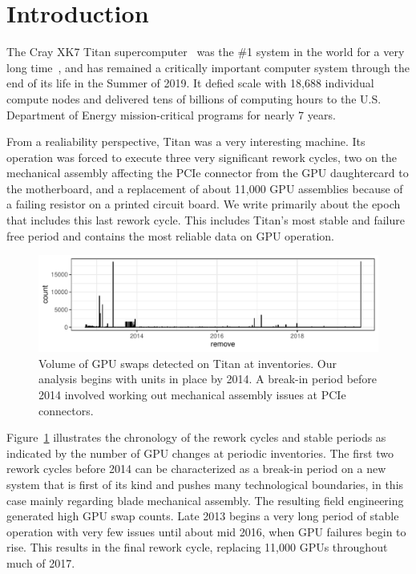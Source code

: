 \section{Introduction}
\label{section:introduction}
The Cray XK7 Titan supercomputer~\cite{olcf:titan} was the \#1 system in the world for a
very long time~\cite{top500list}, and has remained a critically important computer
system through the end of its life in the Summer of 2019. It defied
scale with 18,688 individual compute nodes and delivered tens of
billions of computing hours to the U.S. Department of Energy
mission-critical programs for nearly 7 years.
 
From a realiability perspective, Titan was a very interesting
machine. Its operation was forced to execute three very significant
rework cycles, two on the mechanical assembly affecting the PCIe
connector from the GPU daughtercard to the motherboard, and a
replacement of about 11,000 GPU assemblies because of a failing
resistor on a printed circuit board. We write primarily about the epoch
that includes this last rework cycle. This includes Titan's most
stable and failure free period and contains the most reliable data on
GPU operation.

\begin{figure}[tb]
  \centering
  \includegraphics[width=\textwidth]{figs/chronology001.pdf}
  \caption{Volume of GPU swaps detected on Titan at inventories. Our
    analysis begins with units in place by 2014. A break-in period
    before 2014 involved working out mechanical assembly issues at
    PCIe connectors.}
  \label{fig:chronology}
\end{figure}
Figure~\ref{fig:chronology} illustrates the chronology of the rework
cycles and stable periods as indicated by the number of GPU changes at
periodic inventories.
The first two rework cycles before 2014 can be characterized as a
break-in period on a new system that is first of its kind and pushes
many technological boundaries, in this case mainly regarding blade
mechanical assembly. The resulting field engineering generated high
GPU swap counts. Late 2013 begins a very long period of stable
operation with very few issues until about mid 2016, when GPU failures
begin to rise. This results in the final rework cycle, replacing
11,000 GPUs throughout much of 2017.

